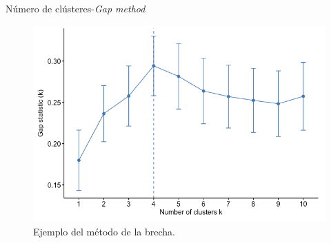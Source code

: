 \documentclass[spanish]{beamer}
\begin{document}
\begin{frame}{Número de clústeres-\textit{Gap method}}
	\begin{figure}[H]
		\centering
		\includegraphics[scale=0.32]{pedro/gapGraph}
		\caption{Ejemplo del método de la brecha.}
	\end{figure}
\end{frame}

\end{document}
